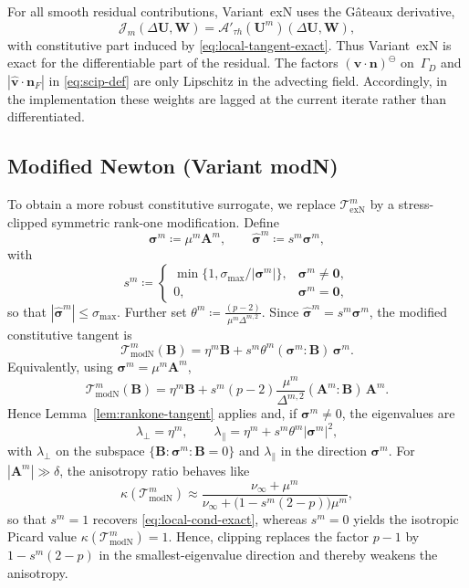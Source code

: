 \documentclass[DIV=16]{scrartcl}
\newcommand{\abs}[1]{\left\lvert #1\right\rvert}
\newcommand{\uu}{\boldsymbol v}
\newcommand{\nn}{\boldsymbol n}
\newcommand{\exact}{\mathrm{exN}}
\newcommand{\clip}{\mathrm{modN}}
\newcommand{\GhD}{\Gamma_{D}}
\newcommand{\negpart}{\ominus}
\newcommand{\yneg}[1]{\left(#1\right)^{\negpart}}
\newcommand{\reg}{\delta}
\newcommand{\pn}{p}
\begin{document}
For all smooth residual contributions, Variant~exN uses the G\^ateaux derivative,
\[
  \mathcal J_m(\Delta\bm U,\bm W)
  = \mathcal A'_{\tau h}(\bm U^m)(\Delta\bm U,\bm W),
\]
with constitutive part induced by \eqref{eq:local-tangent-exact}.
Thus Variant~exN is exact for the differentiable part of the residual.
The factors $\yneg{\uu\cdot\nn}$ on~$\GhD$ and
$\abs{\hat{\uu}\cdot\nn_F}$ in \eqref{eq:scip-def} are only Lipschitz in
the advecting field. Accordingly, in the implementation these weights are
lagged at the current iterate rather than differentiated.

\subsection{Modified Newton (Variant modN)}
\label{sec:newton:modified}
To obtain a more robust constitutive surrogate, we replace
$\mathcal T_{\exact}^m$ by a stress-clipped symmetric rank-one modification.
Define
\[
\bm \sigma^m \coloneq \mu^m \bm A^m,
\qquad
\hat{\bm\sigma}^m \coloneq s^m\bm\sigma^m,
\]
with
\[
s^m \coloneq
\begin{cases}
\min\{1,\sigma_{\max}/\abs{\bm\sigma^m}\}, & \bm\sigma^m\neq \bm 0,\\
0, & \bm\sigma^m=\bm 0,
\end{cases}
\]
so that $\abs{\hat{\bm\sigma}^m}\le \sigma_{\max}$.
Further set
\(
\theta^m \coloneq \frac{(\pn-2)}{\mu^m\Delta^{m,2}} .
\)
Since $\hat{\bm\sigma}^m=s^m\bm\sigma^m$, the modified constitutive tangent is
\begin{equation}\label{eq:local-tangent-clip}
\mathcal T_{\clip}^m(\bm B)
= \eta^m\bm B + s^m\theta^m(\bm\sigma^m:\bm B)\,\bm\sigma^m.
\end{equation}
Equivalently, using $\bm\sigma^m=\mu^m\bm A^m$,
\[
\mathcal T_{\clip}^m(\bm B)
= \eta^m\bm B + s^m(\pn-2)\frac{\mu^m}{\Delta^{m,2}}(\bm A^m:\bm B)\,\bm A^m.
\]
Hence Lemma~\ref{lem:rankone-tangent} applies and,
if $\bm\sigma^m\neq0$, the eigenvalues are
\[
  \lambda_\perp=\eta^m,
  \qquad
  \lambda_\parallel
  = \eta^m + s^m\theta^m |\bm\sigma^m|^2,
\]
with $\lambda_\perp$ on the subspace
$\{\bm B:\bm\sigma^m:\bm B=0\}$ and
$\lambda_\parallel$ in the direction $\bm\sigma^m$.
For $\abs{\bm A^m}\gg\reg$, the anisotropy ratio behaves like
\begin{equation}\label{eq:local-cond-clip}
  \kappa(\mathcal T_{\clip}^m)
  \approx
  \frac{\nu_\infty+\mu^m}
       {\nu_\infty+\bigl(1-s^m(2-\pn)\bigr)\mu^m},
\end{equation}
so that $s^m=1$ recovers \eqref{eq:local-cond-exact}, whereas $s^m=0$ yields
the isotropic Picard value $\kappa(\mathcal T_{\clip}^m)=1$. Hence, clipping
replaces the factor $\pn-1$ by $1-s^m(2-\pn)$ in the
smallest-eigenvalue direction and thereby weakens the anisotropy.
\end{document}

